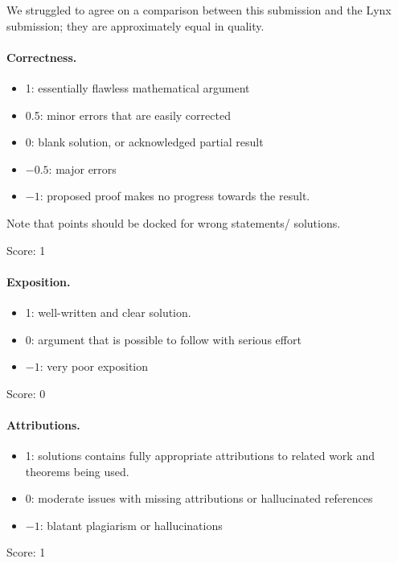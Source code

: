 \documentclass[11pt]{article}
\theoremstyle{definition}
\theoremstyle{remark}
\begin{document}
We struggled to agree on a comparison between this submission and the Lynx submission; they are approximately equal in quality. 


\paragraph{Correctness.}
\begin{itemize}
	\item  1: essentially flawless mathematical argument
	\item  0.5: minor errors that are easily corrected
	\item  0: blank solution, or acknowledged partial result
	\item  $-0.5$: major errors
	\item  $-1$: proposed proof makes no progress towards the result.
\end{itemize}
Note that points should be docked for wrong statements/ solutions.

\noindent Score: 1

\paragraph{Exposition.}
\begin{itemize}
	\item  1: well-written and clear solution.
	\item  0: argument that is possible to follow with serious effort
	\item  $-1$: very poor exposition
\end{itemize}

\noindent Score: 0



\paragraph{Attributions.}
\begin{itemize}
	\item  1: solutions contains fully appropriate attributions
		to related work and theorems being used.
	\item  0: moderate issues with missing attributions or hallucinated references
	\item  $-1$: blatant plagiarism or hallucinations
\end{itemize}

\noindent Score: 1
\end{document}
